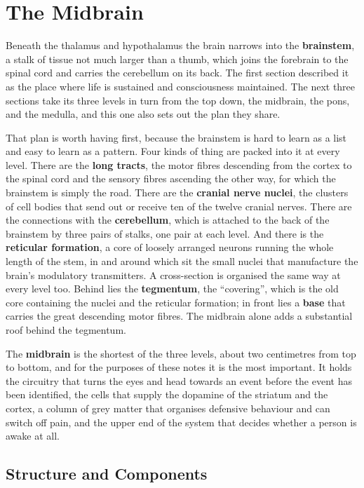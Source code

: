 \documentclass[11pt]{article}
\begin{document}
\section{The Midbrain}

Beneath the thalamus and hypothalamus the brain narrows into the \textbf{brainstem}, a stalk of tissue not much larger than a thumb, which joins the forebrain to the spinal cord and carries the cerebellum on its back. The first section described it as the place where life is sustained and consciousness maintained. The next three sections take its three levels in turn from the top down, the midbrain, the pons, and the medulla, and this one also sets out the plan they share.

That plan is worth having first, because the brainstem is hard to learn as a list and easy to learn as a pattern. Four kinds of thing are packed into it at every level. There are the \textbf{long tracts}, the motor fibres descending from the cortex to the spinal cord and the sensory fibres ascending the other way, for which the brainstem is simply the road. There are the \textbf{cranial nerve nuclei}, the clusters of cell bodies that send out or receive ten of the twelve cranial nerves. There are the connections with the \textbf{cerebellum}, which is attached to the back of the brainstem by three pairs of stalks, one pair at each level. And there is the \textbf{reticular formation}, a core of loosely arranged neurons running the whole length of the stem, in and around which sit the small nuclei that manufacture the brain's modulatory transmitters. A cross-section is organised the same way at every level too. Behind lies the \textbf{tegmentum}, the ``covering'', which is the old core containing the nuclei and the reticular formation; in front lies a \textbf{base} that carries the great descending motor fibres. The midbrain alone adds a substantial roof behind the tegmentum.

The \textbf{midbrain} is the shortest of the three levels, about two centimetres from top to bottom, and for the purposes of these notes it is the most important. It holds the circuitry that turns the eyes and head towards an event before the event has been identified, the cells that supply the dopamine of the striatum and the cortex, a column of grey matter that organises defensive behaviour and can switch off pain, and the upper end of the system that decides whether a person is awake at all.

\subsection{Structure and Components}
\end{document}
